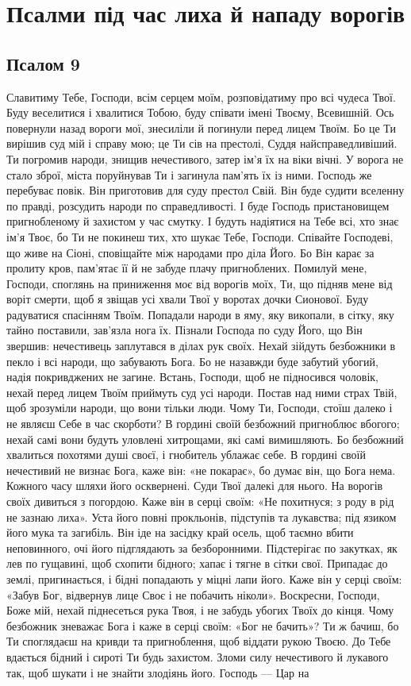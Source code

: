 \documentclass[chapters.tex]{subfiles}
\begin{document}
\section{Псалми під час лиха й нападу ворогів}
\subsection{Псалом 9}

Славитиму Тебе, Господи, всім серцем моїм, розповідатиму про всі чудеса Твої. Буду веселитися і хвалитися Тобою, буду співати імені Твоєму, Всевишній. Ось повернули назад вороги мої, знесиліли й погинули перед лицем Твоїм. Бо це Ти вирішив суд мій і справу мою; це Ти сів на престолі, Суддя найсправедливіший. Ти погромив народи, знищив нечестивого, затер ім’я їх на віки вічні. У ворога не стало зброї, міста поруйнував Ти і загинула пам’ять їх із ними. Господь же перебуває повік. Він приготовив для суду престол Свій. Він буде судити вселенну по правді, розсудить народи по справедливості. І буде Господь пристановищем пригнобленому й захистом у час смутку. І будуть надіятися на Тебе всі, хто знає ім’я Твоє, бо Ти не покинеш тих, хто шукає Тебе, Господи. Співайте Господеві, що живе на Сіоні, сповіщайте між народами про діла Його. Бо Він карає за пролиту кров, пам’ятає її й не забуде плачу пригноблених. Помилуй мене, Господи, споглянь на приниження моє від ворогів моїх, Ти, що підняв мене від воріт смерти, щоб я звіщав усі хвали Твої у воротах дочки Сионової. Буду радуватися спасінням Твоїм. Попадали народи в яму, яку викопали, в сітку, яку тайно поставили, зав’язла нога їх. Пізнали Господа по суду Його, що Він звершив: нечестивець заплутався в ділах рук своїх. Нехай зійдуть безбожники в пекло і всі народи, що забувають Бога. Бо не назавжди буде забутий убогий, надія покривджених не загине. Встань, Господи, щоб не підносився чоловік, нехай перед лицем Твоїм приймуть суд усі народи. Постав над ними страх Твій, щоб зрозуміли народи, що вони тільки люди. Чому Ти, Господи, стоїш далеко і не являєш Себе в час скорботи? В гордині своїй безбожний пригноблює вбогого; нехай самі вони будуть уловлені хитрощами, які самі вимишляють. Бо безбожний хвалиться похотями душі своєї, і гнобитель ублажає себе. В гордині своїй нечестивий не визнає Бога, каже він: «не покарає», бо думає він, що Бога нема. Кожного часу шляхи його осквернені. Суди Твої далекі для нього. На ворогів своїх дивиться з погордою. Каже він в серці своїм: «Не похитнуся; з роду в рід не зазнаю лиха». Уста його повні прокльонів, підступів та лукавства; під язиком його мука та загибіль. Він іде на засідку край осель, щоб таємно вбити неповинного, очі його підглядають за безборонними. Підстерігає по закутках, як лев по гущавині, щоб схопити бідного; хапає і тягне в сітки свої. Припадає до землі, пригинається, і бідні попадають у міцні лапи його. Каже він у серці своїм: «Забув Бог, відвернув лице Своє і не побачить ніколи». Воскресни, Господи, Боже мій, нехай піднесеться рука Твоя, і не забудь убогих Твоїх до кінця. Чому безбожник зневажає Бога і каже в серці своїм: «Бог не бачить»? Ти ж бачиш, бо Ти споглядаєш на кривди та пригноблення, щоб віддати рукою Твоєю. До Тебе вдається бідний і сироті Ти будь захистом. Зломи силу нечестивого й лукавого так, щоб шукати і не знайти злодіянь його. Господь — Цар на 
\end{document}
